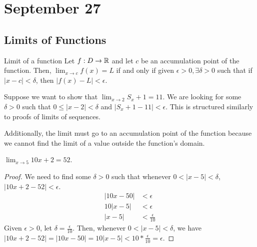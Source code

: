 \chapter{September 27}

\section{Limits of Functions}
\begin{definition}{Limit of a function}{}
    Let $f:D \to \mathbb{R}$ and let $c$ be an accumulation point of the function. Then, $\lim_{x \to c} f(x) = L$ if and only if given $\epsilon > 0, \exists \delta > 0$ such that if $|x - c| < \delta$, then $|f(x) - L| < \epsilon$.
\end{definition}
\begin{note}
    Suppose we want to show that $\lim_{x \to 2} S_x + 1 = 11$. We are looking for some $\delta > 0$ such that $0 \leq |x  - 2| < \delta$ and $|S_x + 1 - 11| < \epsilon$. This is structured similarly to proofs of limits of sequences.

    Additionally, the limit must go to an accumulation point of the function because we cannot find the limit of a value outside the function's domain.
\end{note}

\begin{theorem}{}{}
    $\lim_{x \to 5} 10x + 2 = 52$.
\end{theorem}
\begin{proof}
    We need to find some $\delta > 0$ such that whenever $0 < |x - 5| < \delta$, $|10x + 2 - 52| < \epsilon$.
    \begin{align*}
        |10x - 50| &< \epsilon \\
        10|x - 5| &< \epsilon \\
        |x - 5| &< \frac{\epsilon}{10}
    \end{align*}
    Given $\epsilon > 0$, let $\delta = \frac{\epsilon}{10}$. Then, whenever $0 < |x - 5| < \delta$, we have $|10x + 2 - 52| = |10x - 50| = 10|x - 5| < 10 * \frac{\epsilon}{10} = \epsilon$.
\end{proof}

